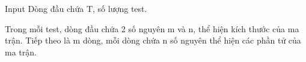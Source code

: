 Input  
Dòng đầu chứa T, số lượng test.  

   Trong mỗi test, dòng đầu chứa 2 số nguyên m và n, thể hiện kích thước của ma trận. Tiếp theo là m dòng, mỗi dòng chứa n số nguyên thể hiện các phần tử của ma trận.